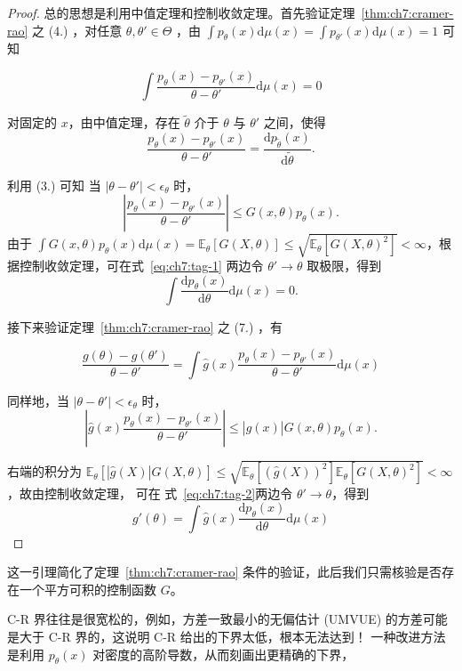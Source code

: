 \begin{proof}

总的思想是利用中值定理和控制收敛定理。首先验证定理~\ref{thm:ch7:cramer-rao} 之 (4.) ，对任意 $\theta,\theta'\in\Theta$ ，由 $\int p_\theta(x) \mathrm d\mu(x) = \int p_{\theta'}(x) \mathrm d\mu(x) = 1$ 可知

\begin{equation}
\label{eq:ch7:tag-1}
\int \frac{p_\theta(x) - p_{\theta'}(x)}{\theta - \theta'} \mathrm d\mu(x) = 0
\end{equation}

对固定的 $x$，由中值定理，存在 $\widetilde{\theta}$ 介于 $\theta$ 与 $\theta'$ 之间，使得
\[
\frac{p_\theta(x) - p_{\theta'}(x)}{\theta - \theta'} = \frac{\mathrm d p_{\widetilde{\theta}}(x)}{\mathrm d\widetilde{\theta}}.
\]

利用 (3.) 可知 当 $|\theta - \theta'| < \epsilon_\theta$ 时，
\[\left|\frac{p_\theta(x) - p_{\theta'}(x)}{\theta - \theta'}\right| \le G(x, \theta) p_\theta(x).\]
由于 $\int G(x, \theta) p_\theta(x) \mathrm{d}\mu(x) = \mathbb{E}_\theta[G(X, \theta)] \le \sqrt{\mathbb{E}_\theta[G(X, \theta)^2]} < \infty$，根据控制收敛定理，可在式~\eqref{eq:ch7:tag-1} 两边令 $\theta' \to \theta$ 取极限，得到
\[
\int \frac{\mathrm d p_\theta(x)}{\mathrm d\theta}\mathrm d\mu(x) = 0.
\]

接下来验证定理~\ref{thm:ch7:cramer-rao} 之 (7.) ，有

\begin{equation}
\label{eq:ch7:tag-2}
\frac{g(\theta) - g(\theta')}{\theta - \theta'} = \int \widehat{g}(x) \frac{p_\theta(x) - p_{\theta'}(x)}{\theta - \theta'} \mathrm d\mu(x)
\end{equation}

同样地，当 $|\theta - \theta'| < \epsilon_\theta$ 时，
\[
\left|\widehat{g}(x) \frac{p_\theta(x) - p_{\theta'}(x)}{\theta - \theta'}\right| \le |\widehat{g}(x)| G(x, \theta) p_\theta(x).
\]

右端的积分为 $\mathbb{E}_\theta[|\widehat{g}(X)| G(X, \theta)] \le \sqrt{\mathbb{E}_\theta[(\widehat{g}(X))^2] \mathbb{E}_\theta[G(X,\theta)^2]} < \infty$，故由控制收敛定理， 可在 式~\eqref{eq:ch7:tag-2}两边令 $\theta' \to \theta$，得到
\[g'(\theta) = \int \widehat{g}(x) \frac{\mathrm d p_\theta(x)}{\mathrm d\theta} \mathrm{d}\mu(x)\]
\end{proof}

这一引理简化了定理~\ref{thm:ch7:cramer-rao} 条件的验证，此后我们只需核验是否存在一个平方可积的控制函数 $G$。

C-R 界往往是很宽松的，例如，方差一致最小的无偏估计 (UMVUE) 的方差可能是大于 C-R 界的，这说明 C-R 给出的下界太低，根本无法达到！%
一种改进方法是利用 $p_\theta(x)$ 对密度的高阶导数，从而刻画出更精确的下界，

